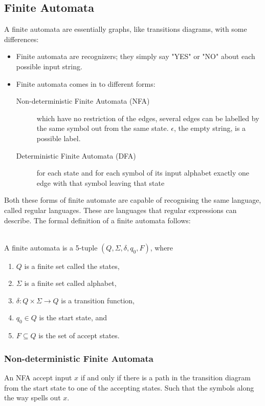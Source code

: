 \subsection{Finite Automata}
A finite automata are essentially graphs, like transitions diagrams, with some 
differences:
\begin{itemize}
  \item Finite automata are recognizers; they simply say "YES" or "NO" about 
each possible input string.
  \item Finite automata comes in to different forms:
    \begin{description}
      \item [Non-deterministic Finite Automata (NFA)] which have no restriction 
of the edges, several edges can be labelled by the same symbol out from the 
same state. $\epsilon$, the empty string, is a possible label. 
      \item [Deterministic Finite Automata (DFA)] for each state and for each 
symbol of its input alphabet exactly one edge with that symbol leaving that 
state
    \end{description}
\end{itemize}
Both these forms of finite automate are capable of recognising the same 
language, called regular languages. These are languages that regular 
expressions can describe. \cite{Aho2006}
The formal definition of a finite automata follows:
\begin{definition} \label{finiteAutomataDef} 
\cite{sipser2006} \\
A finite automata is a 5-tuple $(Q, \Sigma, \delta, q_0, F)$, where
\begin{enumerate}
  \item $Q$ is a finite set called the states,
  \item $\Sigma$ is a finite set called alphabet,
  \item $\delta: Q \times \Sigma \to Q$ is a transition function,
  \item $q_0 \in Q$ is the start state, and
  \item $F \subseteq Q$ is the set of accept states.
\end{enumerate}

\end{definition}
\subsubsection{Non-deterministic Finite Automata}
An NFA accept input $x$ if and only if there is a path in the transition 
diagram from the start state to one of the accepting states. Such that the 
symbols along the way spells out $x$. \cite{Aho2006}

